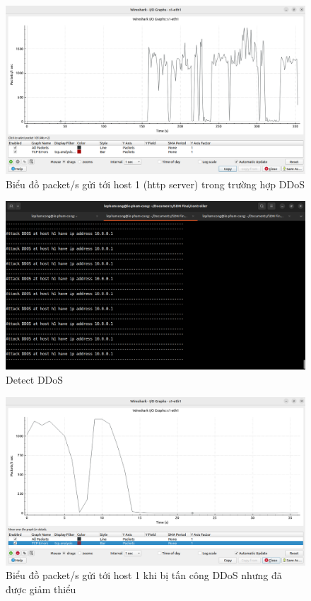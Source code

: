 \documentclass[a4paper]{article}
\begin{document}
\begin{figure}
    \centering
    \includegraphics[width=1\linewidth]{wireshark_ddos.png}
    \caption{Biểu đồ packet/s gửi tới host 1 (http server) trong trường hợp DDoS}
    \label{fig:wireshark_ddos}
\end{figure}
\begin{figure}
    \centering
    \includegraphics[width=1\linewidth]{images//result/detect.png}
    \caption{Detect DDoS}
    \label{fig:detect}
\end{figure}
\begin{figure}
    \centering
    \includegraphics[width=1\linewidth]{images//result/mitigation.png}
    \caption{Biểu đồ packet/s gửi tới host 1 khi bị tấn công DDoS nhưng đã được giảm thiểu}
    \label{fig:mitigation}
\end{figure}
\end{document}
